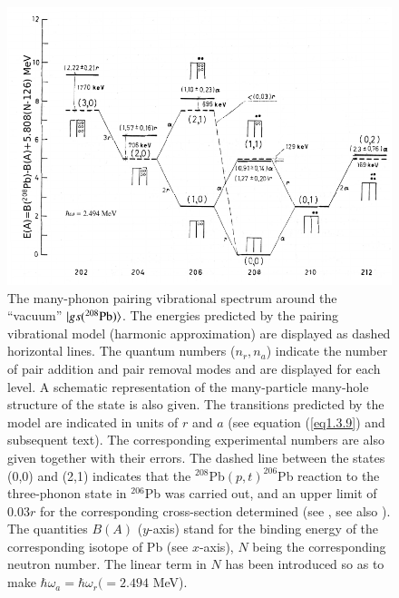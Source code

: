 \begin{figure}
	\centerline {
		\includegraphics*[width=15cm, angle=0.]{introduccion/figs/fig1_3_2}
	}
	\caption{ The many-phonon pairing vibrational spectrum around the ``vacuum'' $|{gs(^{208}\text{Pb})} \rangle$. The energies predicted by the pairing vibrational model (harmonic approximation) are displayed as dashed horizontal lines. The  quantum numbers ($n_r,n_a$) indicate the number of pair addition and pair removal modes and are displayed for each level. A schematic representation of the many-particle many-hole structure of the state is also given. The transitions predicted by the model are indicated in units of $r$ and $a$ (see equation (\ref{eq1.3.9}) and subsequent text). The corresponding experimental numbers are also given together with their errors. The dashed line between the states (0,0) and (2,1) indicates that the $^{208}$Pb$(p,t)^{206}$Pb reaction to the three-phonon state in $^{206}$Pb was carried out, and an upper limit of 0.03$r$ for the corresponding cross-section  determined (see \cite{Flynn:72} \cite{Broglia:73}, see also \cite{Lanford:73}). The quantities $B(A)$ ($y$-axis) stand for the binding energy of the corresponding isotope of Pb (see $x$-axis), $N$ being the corresponding neutron number. The linear term in $N$ has been introduced so as to make $\hbar\omega_a=\hbar\omega_r(=2.494$ MeV).}
	\label{fig0.3.2}
\end{figure}

